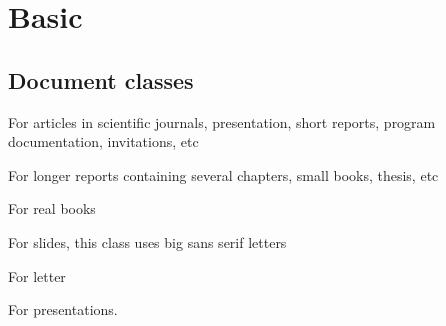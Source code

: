 \chapter{Basic}

\section{Document classes}
\begin{description}[style=nextline]
    \item [article] 
	For articles in scientific journals, presentation, short
	reports, program documentation, invitations, etc
    \item [report]  
	For longer reports containing several chapters, small
	books, thesis, etc
    \item [book] 
	For real books
    \item [slides]
	For slides, this class uses big sans serif letters
    \item [letter]
	For letter
    \item [beamer]
	For presentations.
\end{description}
